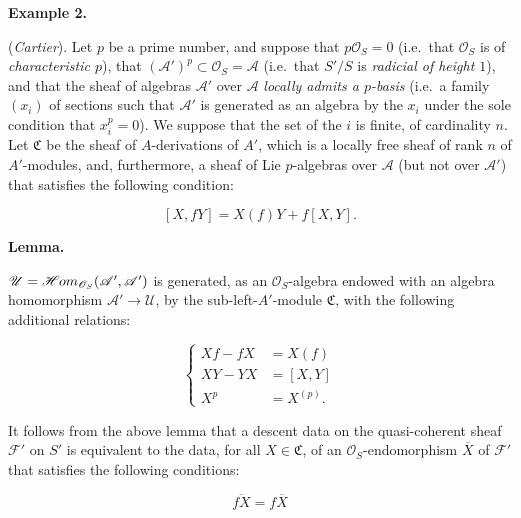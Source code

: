\documentclass{article}
\newenvironment{itenv}[1]
  {\phantomsection\par\smallskip\noindent\textbf{#1.}\itshape}
  {\par\smallskip}
\newenvironment{rmenv}[1]
  {\phantomsection\par\smallskip\noindent\textbf{#1.}\rmfamily}
  {\par\smallskip}
\theoremstyle{definition}
\theoremstyle{definition}
\theoremstyle{definition}
\theoremstyle{definition}
\theoremstyle{remark}
\begin{document}
\hypertarget{fga-3-i-section-B.3-example-2}{}
\begin{rmenv}{Example 2}

(\emph{Cartier}).
Let \(p\) be a prime number, and suppose that \(p{\mathscr{O}}_S=0\) (i.e.~that \({\mathscr{O}}_S\) is of \emph{characteristic \(p\)}), that \(({\mathscr{A}}')^p\subset{\mathscr{O}}_S={\mathscr{A}}\) (i.e.~that \(S'/S\) is \emph{radicial of height \(1\)}), and that the sheaf of algebras \({\mathscr{A}}'\) over \({\mathscr{A}}\) \emph{locally admits a \(p\)-basis} (i.e.~a family \((x_i)\) of sections such that \({\mathscr{A}}'\) is generated as an algebra by the \(x_i\) under the sole condition that \(x_i^p=0\)).
We suppose that the set of the \(i\) is finite, of cardinality \(n\).
Let \({\mathfrak{C}}\) be the sheaf of \(A\)-derivations of \(A'\), which is a locally free sheaf of rank \(n\) of \(A'\)-modules, and, furthermore, a sheaf of Lie \(p\)-algebras over \({\mathscr{A}}\) (but not over \({\mathscr{A}}'\)) that satisfies the following condition:

\leavevmode{}%
\[
  [X,fY] = X(f)Y + f[X,Y].
\tag{3.5}
\]

\end{rmenv}

\begin{itenv}{Lemma}

\({\mathscr{U}}=\mathscr{H}\kern -.5pt om_{{\mathscr{O}}_S}({\mathscr{A}}',{\mathscr{A}}')\) is generated, as an \({\mathscr{O}}_S\)-algebra endowed with an algebra homomorphism \({\mathscr{A}}'\to{\mathscr{U}}\), by the sub-left-\(A'\)-module \({\mathfrak{C}}\), with the following additional relations:

\leavevmode{}%
\[
  \begin{cases}
    Xf-fX &= X(f)
  \\XY-YX &= [X,Y]
  \\X^p &= X^{(p)}.
  \end{cases}
\tag{3.6}
\]

\end{itenv}

It follows from the above lemma that a descent data on the quasi-coherent sheaf \({\mathcal{F}}'\) on \(S'\) is equivalent to the data, for all \(X\in{\mathfrak{C}}\), of an \({\mathscr{O}}_S\)-endomorphism \(\overline{X}\) of \({\mathcal{F}}'\) that satisfies the following conditions:

\leavevmode{}%
\[
  \overline{fX} = f\overline{X}
\tag{3.7}
\]
\end{document}
